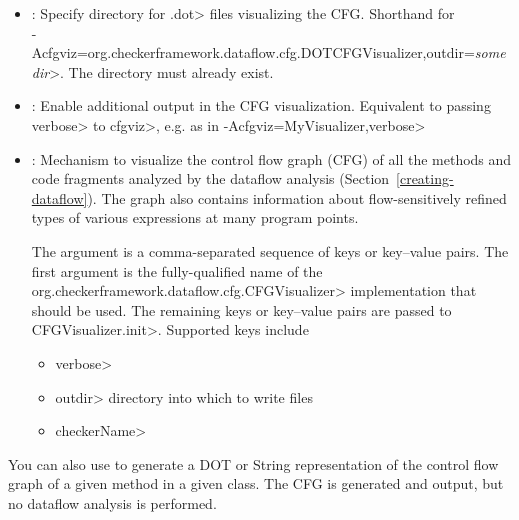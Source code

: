 \begin{itemize}

\item {}:
  Specify directory for \<.dot> files visualizing the CFG\@.
  Shorthand for\\
  \<-Acfgviz=org.checkerframework.dataflow.cfg.DOTCFGVisualizer,outdir=\emph{somedir}>.
  The directory must already exist.

\item {}:
  Enable additional output in the CFG visualization.
  Equivalent to passing \<verbose> to \<cfgviz>, e.g. as in
  \<-Acfgviz=MyVisualizer,verbose>

\item {}:
  Mechanism to visualize the control flow graph (CFG) of
  all the methods and code fragments
  analyzed by the dataflow analysis (Section~\ref{creating-dataflow}).
  The graph also contains information about flow-sensitively refined
  types of various expressions at many program points.

  The argument is a comma-separated sequence of keys or key--value pairs.
  The first argument is the fully-qualified name of the
  \<org.checkerframework.dataflow.cfg.CFGVisualizer> implementation
  that should be used. The remaining keys or key--value pairs are
  passed to \<CFGVisualizer.init>.  Supported keys include
  \begin{itemize}
  \item \<verbose>
  \item \<outdir> directory into which to write files
  \item \<checkerName>
  \end{itemize}

\end{itemize}



You can also use  to generate a DOT
or String representation of the control flow graph of a given method in a given class.
The CFG is generated and output, but no dataflow analysis is performed.

